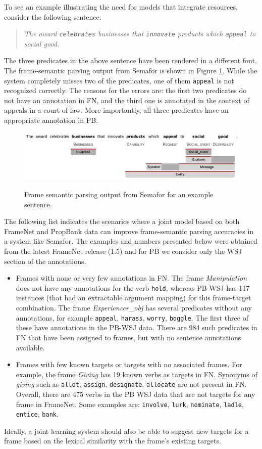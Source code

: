 \documentclass[11pt]{article}
\begin{document}
To see an example illustrating the need for models that integrate resources, consider the following sentence:
\begin{quote}
\textit{The award \texttt{celebrates} businesses that \texttt{innovate} products which \texttt{appeal} to social good.}
\end{quote}

The three predicates in the above sentence have been rendered in a different font. The frame-semantic parsing output from Semafor is shown in Figure \ref{fig:semaforOutput}. While the system completely misses two of the predicates, one of them \texttt{appeal} is not recognized correctly. The reasons for the errors are: the first two predicates do not have an annotation in FN, and the third one is annotated in the context of appeals in a court of law. More importantly, all three predicates have an appropriate annotation in PB.

\begin{figure}
\caption{Frame semantic parsing output from Semafor for an example sentence.}
\includegraphics[scale=0.4]{semafor_output.jpg}
\label{fig:semaforOutput}
\end{figure}


The following list indicates the scenarios where a joint model based on both FrameNet and PropBank data can improve frame-semantic parsing accuracies in a system like Semafor. The examples and numbers presented below were obtained from the latest FrameNet release (1.5) and for PB we consider only the WSJ section of the annotations.
\begin{itemize}
\item Frames with none or very few annotations in FN. The frame \textit{Manipulation} does not have any annotations for the verb \texttt{hold}, whereas PB-WSJ has 117 instances (that had an extractable argument mapping) for this frame-target combination. The frame \textit{Experiencer\_obj} has several predicates without any annotations, for example \texttt{appeal}, \texttt{harass}, \texttt{worry}, \texttt{boggle}. The first three of these have annotations in the PB-WSJ data. There are 984 such predicates in FN that have been assigned to frames, but with no sentence annotations available.
\item Frames with few known targets or targets with no associated frames. For example, the frame \textit{Giving} has 19 known verbs as targets in FN. Synonyms of \textit{giving} such as \texttt{allot}, \texttt{assign}, \texttt{designate}, \texttt{allocate} are not present in FN. Overall, there are 475 verbs in the PB WSJ data that are not targets for any frame in FrameNet. Some examples are: \texttt{involve}, \texttt{lurk}, \texttt{nominate}, \texttt{ladle}, \texttt{entice}, \texttt{bank}.
\end{itemize}
Ideally, a joint learning system should also be able to suggest new targets for a frame based on the lexical similarity with the frame's existing targets.
\end{document}
